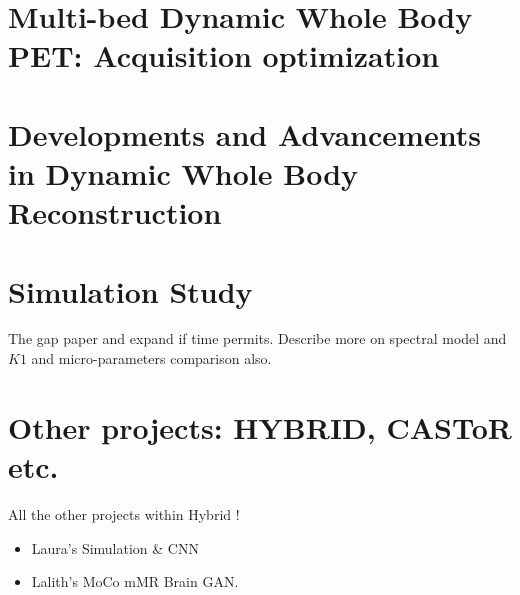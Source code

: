 

\chapter{Multi-bed Dynamic Whole Body PET: Acquisition optimization}


\chapter{Developments and Advancements in Dynamic Whole Body Reconstruction}


\chapter{Simulation Study}
The gap paper and expand if time permits. Describe more on spectral model and $K1$ and micro-parameters comparison also. \\

\chapter{Other projects: HYBRID, CASToR etc.}
All the other projects within Hybrid ! \\
\begin{itemize}
    \item Laura's Simulation \& CNN \\
    \item Lalith's MoCo mMR Brain GAN. \\
\end{itemize}

